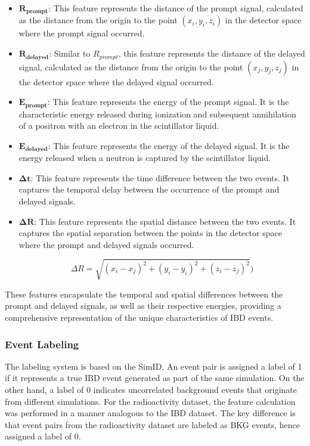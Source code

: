\begin{itemize}
	 
	\item $\mathbf{R_{prompt}}$: This feature represents the distance of the prompt signal, calculated as the distance from the origin to the point $(x_i, y_i, z_i)$ in the detector space where the prompt signal occurred.	
	
	\item $\mathbf{R_{delayed}}$: Similar to $R_{prompt}$, this feature represents the distance of the delayed signal, calculated as the distance from the origin to the point $(x_j, y_j, z_j)$ in the detector space where the delayed signal occurred.

	\item $\mathbf{E_{prompt}}$: This feature represents the energy of the prompt signal. It is the characteristic energy released during ionization and subsequent annihilation of a positron with an electron in the scintillator liquid.

	\item $\mathbf{E_{delayed}}$: This feature represents the energy of the delayed signal. It is the energy released when a neutron is captured by the scintillator liquid.

	\item $\mathbf{\Delta t}$: This feature represents the time difference between the two events. It captures the temporal delay between the occurrence of the prompt and delayed signals.

	\item $\mathbf{\Delta R}$: This feature represents the spatial distance between the two events. It captures the spatial separation between the points in the detector space where the prompt and delayed signals occurred.

\begin{equation*}
  \Delta R = \sqrt{{(x_i - x_j)^2 + (y_i - y_i)^2 + (z_i - z_j)^2}}) 
\end{equation*}


\end{itemize}
These features encapsulate the temporal and spatial differences between the prompt and delayed signals, as well as their respective energies, providing a comprehensive representation of the unique characteristics of IBD events.


\subsubsection*{Event Labeling}
The labeling system is based on the SimID. An event pair is assigned a label of 1 if it represents a true IBD event generated as part of the same simulation. On the other hand, a label of 0 indicates uncorrelated background events that originate from different simulations.
For the radioactivity dataset, the feature calculation was performed in a manner analogous to the IBD dataset. The key difference is that event pairs from the radioactivity dataset are labeled as BKG events, hence assigned a label of 0.

